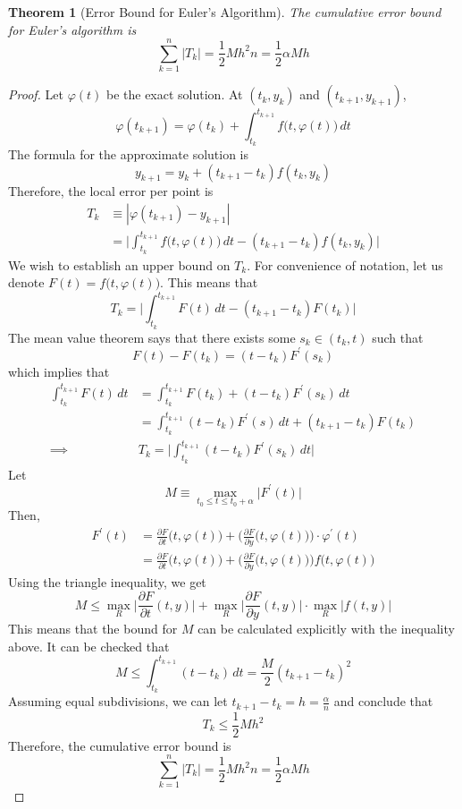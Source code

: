 \documentclass{article}
\newtheorem{theorem}{Theorem}[section]
\theoremstyle{remark}
\theoremstyle{definition}
\begin{document}
    \begin{theorem}[Error Bound for Euler's Algorithm]
    The cumulative error bound for Euler's algorithm is
    \[\sum_{k=1}^n |T_k| = \frac{1}{2} M h^2 n = \frac{1}{2} \alpha M h\]
    \end{theorem}
    \begin{proof}
    Let $\varphi(t)$ be the exact solution. At $(t_k, y_k)$ and $(t_{k+1}, y_{k+1})$, 
    \[\varphi(t_{k+1}) = \varphi(t_k) + \int_{t_k}^{t_{k+1}} f\big(t, \varphi(t)\big) \, dt\]
    The formula for the approximate solution is
    \[y_{k+1} = y_k + (t_{k+1} - t_k) f(t_k, y_k)\]
    Therefore, the local error per point is 
    \begin{align*}
        T_k & \equiv |\varphi(t_{k+1}) - y_{k+1}| \\
        & = \bigg| \int_{t_k}^{t_{k+1}} f\big(t, \varphi(t)\big)\, dt - (t_{k+1} - t_k) f(t_k, y_k) \bigg| 
    \end{align*}
    We wish to establish an upper bound on $T_k$. For convenience of notation, let us denote $F(t) = f\big(t, \varphi(t)\big)$. This means that 
    \[T_k = \bigg| \int_{t_k}^{t_{k+1}} F(t)\,dt - (t_{k+1} - t_k ) F(t_k) \bigg| \]
    The mean value theorem says that there exists some $s_k \in (t_k, t)$ such that 
    \[F(t) - F(t_k) = (t - t_k) F^\prime (s_k)\]
    which implies that
    \begin{align*}
        \int_{t_k}^{t_{k+1}} F(t)\, dt & = \int_{t_k}^{t_{k+1}} F(t_k) + (t - t_k) F^\prime (s_k)\,dt \\
        & = \int_{t_k}^{t_{k+1}} (t - t_k) F^\prime (s) \, dt + (t_{k+1} - t_k) F (t_k) \\
        \implies & T_k = \bigg| \int_{t_k}^{t_{k+1}}  (t - t_k) F^\prime (s_k)\, dt \bigg|
    \end{align*}
    Let 
    \[M \equiv \max_{t_0 \leq t \leq t_0 + \alpha} \big| F^\prime (t) \big|\]
    Then, 
    \begin{align*}
        F^\prime (t) & = \frac{\partial F}{\partial t} \big(t, \varphi(t)\big) + \bigg( \frac{\partial F}{\partial y} \big(t, \varphi(t)\big) \bigg) \cdot \varphi^\prime (t) \\
        & = \frac{\partial F}{\partial t} \big(t, \varphi (t)\big) + \bigg(\frac{\partial F}{\partial y} \big(t, \varphi(t)\big) \bigg) f \big(t, \varphi(t)\big)
    \end{align*}
    Using the triangle inequality, we get
    \[M \leq \max_R \Big| \frac{\partial F}{\partial t} (t, y)\Big| + \max_R \Big| \frac{\partial F}{\partial y} (t, y)\Big| \cdot \max_R \Big| f(t, y) \Big|\]
    This means that the bound for $M$ can be calculated explicitly with the inequality above. It can be checked that
    \[M \leq \int_{t_k}^{t_{k+1}} (t - t_k) \, dt = \frac{M}{2}(t_{k+1} - t_k)^2 \]
    Assuming equal subdivisions, we can let $t_{k+1} - t_k = h = \frac{\alpha}{n}$ and conclude that 
    \[T_k \leq \frac{1}{2} M h^2\]
    Therefore, the cumulative error bound is 
    \[\sum_{k=1}^n |T_k| = \frac{1}{2} M h^2 n = \frac{1}{2} \alpha M h\]
    \end{proof}
\end{document}
